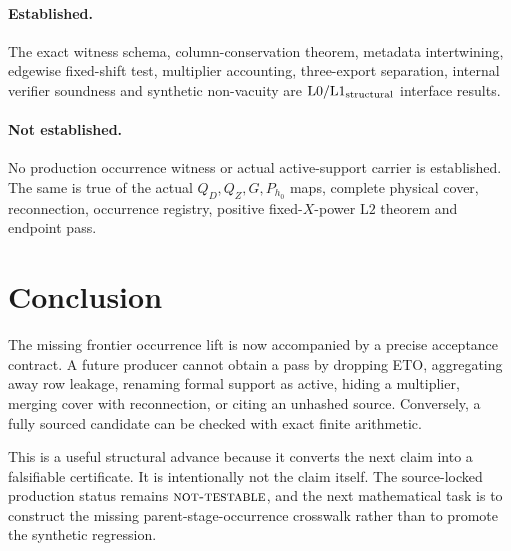 \documentclass[11pt]{article}
\numberwithin{equation}{section}
\theoremstyle{definition}
\theoremstyle{remark}
\newcommand{\Lzero}{\mathrm{L0}}
\newcommand{\Lone}{\mathrm{L1}}
\newcommand{\Ltwo}{\mathrm{L2}}
\newcommand{\NT}{\textnormal{\textsc{not-testable}}}
\begin{document}
\paragraph{Established.}
The exact witness schema, column-conservation theorem, metadata
intertwining, edgewise fixed-shift test, multiplier accounting,
three-export separation, internal verifier soundness and synthetic
non-vacuity are \(\Lzero/\Lone_{\rm structural}\) interface results.

\paragraph{Not established.}
No production occurrence witness or actual active-support carrier is
established.  The same is true of the actual \(Q_D,Q_Z,G,P_{h_0}\)
maps, complete physical cover, reconnection, occurrence registry,
positive fixed-\(X\)-power \(\Ltwo\) theorem and endpoint pass.

\section{Conclusion}

The missing frontier occurrence lift is now accompanied by a precise
acceptance contract.  A future producer cannot obtain a pass by
dropping ETO, aggregating away row leakage, renaming formal support as
active, hiding a multiplier, merging cover with reconnection, or
citing an unhashed source.  Conversely, a fully sourced candidate can
be checked with exact finite arithmetic.

This is a useful structural advance because it converts the next
claim into a falsifiable certificate.  It is intentionally not the
claim itself.  The source-locked production status remains
\(\NT\), and the next mathematical task is to construct the missing
parent-stage-occurrence crosswalk rather than to promote the synthetic
regression.



\end{document}
